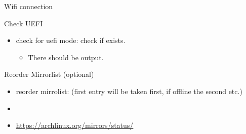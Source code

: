 \begin{frame}{Wifi connection\vspace{0.25cm}}
\end{frame}

\begin{frame}[fragile]{Check UEFI}
  \begin{itemize}
    \item \alert{check for uefi mode:}  check if exists.
      \begin{itemize}
        \item There should be output.
      \end{itemize}
  \end{itemize}
\end{frame}

\begin{frame}[fragile]{Reorder Mirrorlist (optional)}
  \begin{itemize}
    \item \alert{reorder mirrolist:}  (first entry will be taken first, if offline the second etc.)
    \item {}
    \item \url{https://archlinux.org/mirrors/status/}
  \end{itemize}
\end{frame}

